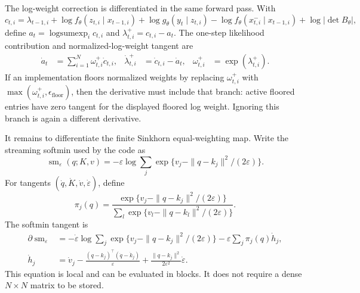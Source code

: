 The log-weight correction is differentiated in the same forward pass.  With
\begin{equation}
  c_{t,i}
  =\lambda_{t-1,i}
   +\log f_\theta(z_{t,i}\mid x_{t-1,i})
   +\log g_\theta(y_t\mid z_{t,i})
   -\log f_\theta(x^-_{t,i}\mid x_{t-1,i})
   +\log|\det B_\theta|,
  \label{eq:bf-hd-ledh-compact-corrected-weight}
\end{equation}
define \(a_t=\operatorname{logsumexp}_i c_{t,i}\) and
\(\lambda^+_{t,i}=c_{t,i}-a_t\).  The one-step likelihood contribution and
normalized-log-weight tangent are
\begin{align}
  \dot a_t &= \sum_{i=1}^N \omega^+_{t,i}\dot c_{t,i},&
  \dot\lambda^+_{t,i} &= \dot c_{t,i}-\dot a_t,&
  \omega^+_{t,i}&=\exp(\lambda^+_{t,i}).
  \label{eq:bf-hd-ledh-compact-normalize-sensitivity}
\end{align}
If an implementation floors normalized weights by replacing
\(\omega^+_{t,i}\) with \(\max(\omega^+_{t,i},\epsilon_{\mathrm{floor}})\),
then the derivative must include that branch: active floored entries have zero
tangent for the displayed floored log weight.  Ignoring this branch is again a
different derivative.

It remains to differentiate the finite Sinkhorn equal-weighting map.  Write the
streaming softmin used by the code as
\begin{equation}
  \operatorname{sm}_\varepsilon(q;K,v)
  =
  -\varepsilon\log\sum_j
    \exp\{v_j-\|q-k_j\|^2/(2\varepsilon)\}.
  \label{eq:bf-hd-ledh-compact-softmin}
\end{equation}
For tangents \((\dot q,\dot K,\dot v,\dot\varepsilon)\), define
\begin{equation}
  \pi_j(q)
  =
  \frac{\exp\{v_j-\|q-k_j\|^2/(2\varepsilon)\}}
       {\sum_l\exp\{v_l-\|q-k_l\|^2/(2\varepsilon)\}} .
\end{equation}
The softmin tangent is
\begin{align}
  \partial\operatorname{sm}_\varepsilon
  &=
  -\dot\varepsilon\log\sum_j
    \exp\{v_j-\|q-k_j\|^2/(2\varepsilon)\}
  -\varepsilon\sum_j\pi_j(q)\dot h_j,
  \label{eq:bf-hd-ledh-compact-softmin-jvp}\\
  \dot h_j
  &=
  \dot v_j
  -\frac{(q-k_j)^\top(\dot q-\dot k_j)}{\varepsilon}
  +\frac{\|q-k_j\|^2}{2\varepsilon^2}\dot\varepsilon .
  \nonumber
\end{align}
This equation is local and can be evaluated in blocks.  It does not require a
dense \(N\times N\) matrix to be stored.

